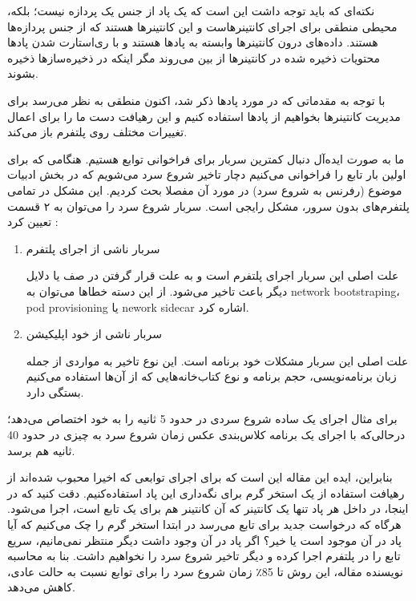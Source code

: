 نکته‌ای که باید توجه داشت این است که یک پاد از جنس یک پردازه نیست؛ بلکه، محیطی منطقی برای اجرای کانتینر‌هاست و این کانتینرها هستند که از جنس پردازه‌ها هستند. داده‌های درون کانتینر‌ها وابسته به پادها هستند و با ری‌استارت شدن پادها محتویات ذخیره شده در کانتینرها از بین می‌روند مگر اینکه در ذخیره‌سازها ذخیره بشوند.\cite{KubernetesInAction}

با توجه به مقدماتی که در مورد پاد‌ها ذکر شد، اکنون منطقی به نظر می‌رسد برای مدیریت کانتینر‌ها بخواهیم از پادها استفاده کنیم و این رهیافت دست ما را برای اعمال تغییرات مختلف روی پلتفرم باز می‌کند. 

ما به صورت ایده‌آل دنبال کمترین سربار برای فراخوانی توابع هستیم. هنگامی که برای اولین بار تابع را فراخوانی می‌کنیم دچار تاخیر شروع سرد می‌شویم که در بخش ادبیات موضوع (رفرنس به شروع سرد)‌ در مورد آن مفصلا بحث کردیم. این مشکل در تمامی پلتفرم‌های بدون سرور، مشکل رایجی است. سربار شروع سرد را می‌توان به ۲ قسمت تعیین کرد :‌

\begin{enumerate}
	\item سربار ناشی از اجرای پلتفرم
	
علت اصلی این سربار اجرای پلتفرم است و به علت قرار گرفتن در صف یا دلایل دیگر باعث تاخیر می‌شود. از این دسته خطا‌ها می‌توان به network bootstraping، pod provisioning یا nework sidecar اشاره کرد. 
	
	\item سربار ناشی از خود اپلیکیشن
	
علت اصلی این سربار مشکلات خود برنامه است. این نوع تاخیر به مواردی از جمله زبان برنامه‌نویسی، حجم برنامه و نوع کتاب‌خانه‌هایی که از آن‌ها استفاده می‌کنیم بستگی دارد.
	
	
\end{enumerate}
 

برای مثال اجرای یک  ساده شروع سردی در حدود 5 ثانیه را به خود اختصاص می‌دهد؛ درحالی‌که با اجرای یک برنامه کلاس‌بندی عکس زمان شروع سرد به چیزی در حدود 40 ثانیه هم برسد. 

بنابراین، ایده این مقاله این است که برای اجرای توابعی که اخیرا محبوب شد‌ه‌اند از رهیافت استفاده از یک استخر گرم برای نگه‌داری این پاد استفاده‌کنیم. دقت کنید که در اینجا، در داخل هر پاد تنها یک کانتینر که آن کانتینر هم برای یک تابع است، اجرا می‌شود. هرگاه که درخواست جدید برای تابع می‌رسد در ابتدا استخر گرم را چک می‌کنیم که آیا پاد در آن موجود است یا خیر؟ اگر پاد در آن وجود داشت دیگر منتظر نمی‌مانیم، سریع تابع را در پلتفرم اجرا کرده و دیگر تاخیر شروع سرد را نخواهیم داشت. بنا به محاسبه نویسنده مقاله، این روش تا 85٪ زمان شروع سرد را برای توابع  نسبت به حالت عادی، کاهش می‌دهد. 

